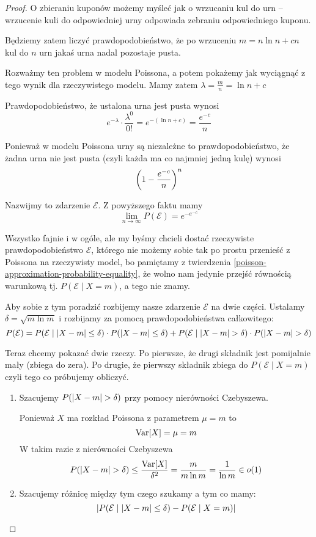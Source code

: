 \begin{proof}
O zbieraniu kuponów możemy myśleć jak o wrzucaniu kul do urn -- wrzucenie kuli do odpowiedniej urny odpowiada zebraniu odpowiedniego kuponu. 

Będziemy zatem liczyć prawdopodobieństwo, że po wrzuceniu \( m = n \ln n + cn \) kul do \( n \) urn jakaś urna nadal pozostaje pusta.

Rozważmy ten problem w modelu Poissona, a potem pokażemy jak wyciągnąć z tego wynik dla rzeczywistego modelu.
Mamy zatem \( \lambda = \frac{m}{n} = \ln n + c \)

Prawdopodobieństwo, że ustalona urna jest pusta wynosi
\[
    e^{-\lambda} \cdot \frac{\lambda^0}{0!} = e^{-(\ln n + c)} = \frac{e^{-c}}{n}
\]

Ponieważ w modelu Poissona urny są niezależne to prawdopodobieństwo, że żadna urna nie jest pusta (czyli każda ma co najmniej jedną kulę) wynosi
\[
    \left(1 - \frac{e^{-c}}{n}\right)^n
\]

Nazwijmy to zdarzenie \( \mathcal{E} \). Z powyższego faktu mamy
\[
    \lim_{n \rightarrow \infty} P(\mathcal{E}) = e^{-e^{-c}}
\]

Wszystko fajnie i w ogóle, ale my byśmy chcieli dostać rzeczywiste prawdopodobieństwo \( \mathcal{E} \), którego nie możemy sobie tak po prostu przenieść z Poissona na rzeczywisty model, bo pamiętamy z twierdzenia \ref{poisson-approximation-probability-equality}, że wolno nam jedynie przejść równością warunkową tj.
\( P( \mathcal{E} \mid X = m) \), a tego nie znamy.

Aby sobie z tym poradzić rozbijemy nasze zdarzenie \( \mathcal{E} \) na dwie części.
Ustalamy \( \delta = \sqrt{m \ln m} \) i rozbijamy za pomocą prawdopodobieństwa całkowitego:
\[
    P(\mathcal{E}) = 
        P(\mathcal{E} \mid \left\lvert X - m\right\rvert \leq \delta) \cdot P(\left\lvert X - m\right\rvert \leq \delta)
        +
        P(\mathcal{E} \mid \left\lvert X - m\right\rvert > \delta) \cdot P(\left\lvert X - m\right\rvert > \delta)
\]

Teraz chcemy pokazać dwie rzeczy. Po pierwsze, że drugi składnik jest pomijalnie mały (zbiega do zera).
Po drugie, że pierwszy składnik zbiega do \( P(\mathcal{E} \mid X = m) \) czyli tego co próbujemy obliczyć.

\begin{enumerate}
    \item Szacujemy \( P(\left\lvert X - m\right\rvert > \delta) \) przy pomocy nierówności Czebyszewa.
    
    Ponieważ \( X \) ma rozkład Poissona z parametrem \( \mu = m \) to
    \[ \variance{X} = \mu = m \]
    W takim razie z nierówności Czebyszewa
    \[
        P(\abs{X - m} > \delta) \leq \frac{\variance{X}}{\delta^2} = \frac{m}{m \ln m} = \frac{1}{\ln m} \in o(1)
    \]
    \item Szacujemy różnicę między tym czego szukamy a tym co mamy:
    \[ \left\lvert P(\mathcal{E} \mid \left\lvert X - m\right\rvert \leq \delta) - P(\mathcal{E} \mid X = m)\right\rvert \]
    

\end{enumerate}
\end{proof}
